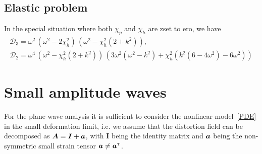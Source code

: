 \documentclass[
10pt, %
a4paper, %
oneside, %
headinclude,footinclude, %
table
]{scrartcl}
\begin{document}
\subsection{Elastic problem}

In the special situation where both $\chi_{p}$ and $\chi_{h}$ are zset to ero, we have
$$
\begin{array}{c}
\mathcal{D}_{3}=\omega^2\, \left(\omega^2-2\chi_{h}^2\right)\, \left(\omega^2-\chi_{h}^2(2+k^2)\right), \\[6pt]
\mathcal{D}_{2}=\omega^4 \, \left(\omega^2-\chi_{h}^2(2+k^2)\right) \, \left( 
 3 \omega^2(\omega^2 - k^2)+ \chi_{h}^2( k^2 (6 - 4 \omega^2)-6 \omega^2)  \right)
 \end{array}
$$

\section{Small amplitude waves}

For the plane-wave analysis it is sufficient to consider the nonlinear model~\eqref{PDE} in the 
small deformation limit, i.e. we assume that the distortion field can be decomposed as $ \bm{A} = 
\bm{I} + \bm{a} $, with $ \bm{I} $ being the identity matrix and $ \bm{a} $ being the 
non-symmetric small strain tensor $ \Distsmall \neq \Distsmall^\transpose $.



\printbibliography
\end{document}
